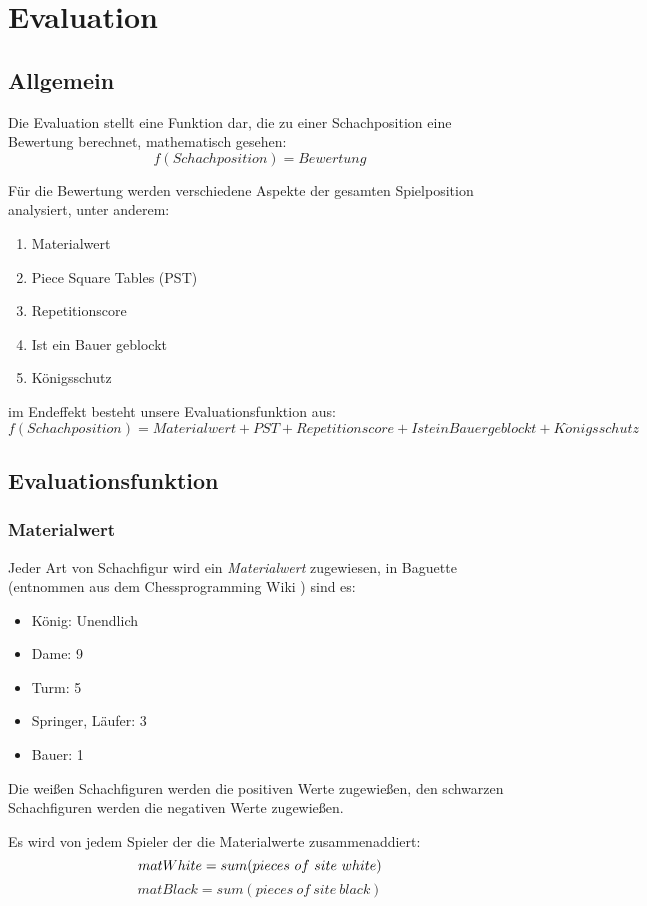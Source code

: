 \section{Evaluation}\label{eval}
\subsection{Allgemein}
Die Evaluation stellt eine Funktion dar, die zu einer Schachposition eine Bewertung berechnet, mathematisch gesehen: 
$$
f(Schachposition) = Bewertung
$$

Für die Bewertung werden verschiedene Aspekte der gesamten Spielposition analysiert, unter anderem: 
\begin{enumerate}
    \item{Materialwert}
    \item{Piece Square Tables (PST)}
    \item{Repetitionscore}
    \item{Ist ein Bauer geblockt}
    \item{K\"onigsschutz}
\end{enumerate}

im Endeffekt besteht unsere Evaluationsfunktion aus:
$$
f(Schachposition) = Materialwert + PST + Repetitionscore + Ist ein Bauer geblockt + K\ddot{o}nigsschutz
$$

\subsection{Evaluationsfunktion}

\subsubsection{Materialwert}
Jeder Art von Schachfigur wird ein \textit{Materialwert} zugewiesen, in Baguette (entnommen aus dem Chessprogramming Wiki \cite[]{materialvalues}) sind es:
\begin{itemize}
    \item{König: Unendlich} 
    \item{Dame: 9}
    \item{Turm: 5}
    \item{Springer, Läufer: 3}
    \item{Bauer: 1}
\end{itemize}
Die weißen Schachfiguren werden die positiven Werte zugewießen, den schwarzen Schachfiguren werden die negativen Werte zugewießen.

Es wird von jedem Spieler der die Materialwerte zusammenaddiert:
$$
matWhite = sum(pieces\ of\ site\ white) \\
$$
$$
matBlack = sum(pieces\ of\ site\ black)
$$

